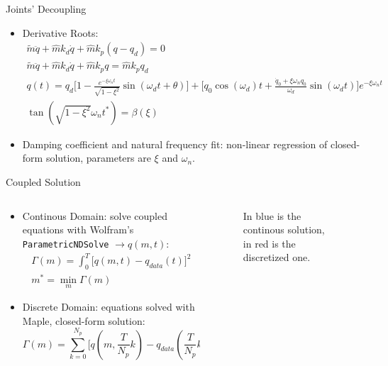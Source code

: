 \begin{frame}{Joints' Decoupling}
  \begin{itemize}
    \item Derivative Roots:
    \begin{equation}
      \begin{array}{c}
        \tilde{m}\ddot{q}+\hat{m}k_d\dot{q}+\hat{m}k_p (q-q_d)=0\\
        \tilde{m}\ddot{q}+\hat{m}k_d\dot{q}+\hat{m}k_p q=\hat{m}k_pq_d\\
        q(t)=q_d\Big[1-\frac{e^{-\xi\omega_nt}}{\sqrt{1-\xi^2}}\sin{(\omega_dt+\theta)}\Big]+\Big[q_0\cos{(\omega_d)t}+\frac{\dot{q}_0+\xi\omega_n q_0}{\omega_d}\sin{(\omega_dt)}\Big]e^{-\xi \omega_n t}\\
        \tan{(\sqrt{1-\xi^2}\omega_nt^*)}=\beta(\xi)
      \end{array}
    \end{equation}
    \item Damping coefficient and natural frequency fit: non-linear regression of closed-form solution, parameters are $\xi$ and $\omega_n$.
  \end{itemize}
\end{frame}

\begin{frame}{Coupled Solution}
  \begin{columns}
    \begin{column}{0.5\textwidth}
      \begin{itemize}
        \item Continous Domain: solve coupled equations with Wolfram's \texttt{ParametricNDSolve} $\rightarrow q(m,t)$:
        \begin{equation}
          \begin{array}{c}
            \Gamma(m)=\int_{0}^{T}\Big[q(m,t)-q_{data}(t)\Big]^2\\
            m^*=\min_{m}\Gamma(m)
          \end{array}
        \end{equation}
        \item Discrete Domain: equations solved with Maple, closed-form solution:
        \begin{equation}
          \varGamma(m)=\sum_{k=0}^{N_p}\Big[q(m,\frac{T}{N_p}k)-q_{data}(\frac{T}{N_p}k)\Big]^2
        \end{equation}
      \end{itemize}
    \end{column}
    \begin{column}{0.5\textwidth}
      \begin{figure}
        \centering
        
        \caption{In blue is the continous solution, in red is the discretized one.}
      \end{figure}
    \end{column}
  \end{columns}
\end{frame}

